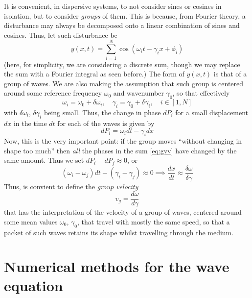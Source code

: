 \documentclass[11pt,twoside,a4paper,english]{book}
\begin{document}
\medskip \medskip 
\noindent
It is convenient, in dispersive systems, to not consider sines or cosines in isolation, but to consider \emph{groups} of them. This is because, from Fourier theory, a disturbance may always be decomposed onto a linear combination of sines and cosines. Thus, let such disturbance be
\begin{equation}\label{eq:gvv}
y(x,t) = \sum_{i=1}^N \cos(\omega_i t - \gamma_i x + \phi_i)
\end{equation}
(here, for simplicity, we are considering a discrete sum, though we may replace the sum with a Fourier integral as seen before.) The form of $y(x,t)$ is that of a group of waves. We are also making the assumption that such group is centered around some reference frequency $\omega_0$ and wavenumber $\gamma_0$, so that effectively
\begin{equation}
\omega_i = \omega_0 + \delta \omega_i, \quad \gamma_i = \gamma_0 + \delta \gamma_i, \quad i \in [1,N]
\end{equation} 
with $\delta \omega_i$,  $\delta \gamma_i$ being small. Thus, the change in phase $dP_i$ for a small displacement $dx$ in the time $dt$ for each of the waves is given by
\begin{equation}
dP_i = \omega_i dt - \gamma_i dx
\end{equation}
Now, this is the very important point: if the group moves ``without changing in shape too much'' then \emph{all} the phases in the sum \eqref{eq:gvv} have changed by the same amount. Thus we set $dP_i - dP_j \approx 0$, or
\begin{equation}
(\omega_i-\omega_j)dt - (\gamma_i-\gamma_j) \approx 0 \implies \frac{dx}{dt} \approx \frac{\delta \omega}{\delta \gamma}
\end{equation}
Thus, is convient to define the \emph{group velocity} 
\begin{equation}
v_{g} = \frac{d \omega }{d \gamma} 
\end{equation}
that has the interpretation of the velocity of a group of waves, centered around some mean values $\omega_0$, $\gamma_0$, that travel with mostly the same speed, so that a packet of such waves retains its shape whilst travelling through the medium.



\chapter{Numerical methods for the wave equation}
\end{document}
